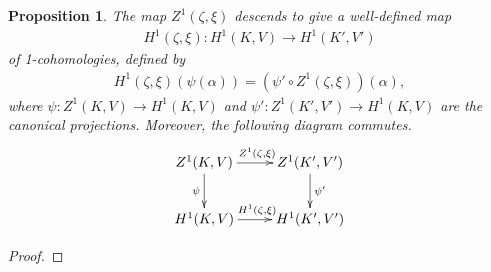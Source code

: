 \documentclass[12pt, a4paper]{amsart}
\newtheorem{prop}{Proposition}
\begin{document}
\begin{prop}
	The map $Z^1(\zeta, \xi)$ descends to give a well-defined map
	\begin{eqnarray*}
		H^1(\zeta, \xi):H^1(K, V) \rightarrow H^1(K', V')
	\end{eqnarray*}
	of 1-cohomologies, defined by
	\begin{eqnarray*}
		H^1(\zeta, \xi)\left(\psi(\alpha)\right) = \left(\psi' \circ Z^1(\zeta, \xi)\right)(\alpha),
	\end{eqnarray*}
	where $\psi:Z^1(K, V)\rightarrow H^1(K, V)$ and $\psi':Z^1(K', V')\rightarrow H^1(K, V)$ are the canonical projections. Moreover, the following diagram commutes.
	\begin{eqnarray*}
	\xymatrix{
	Z^1(K, V) \ar[d]_{\psi} \ar[r]^{Z^1(\zeta, \xi)} & Z^1(K', V') \ar[d]^{\psi'} \\
	H^1(K, V)               \ar[r]^{H^1(\zeta, \xi)} & H^1(K', V') \\
	}
	\end{eqnarray*}
\end{prop}
\begin{proof}
\end{proof}
\end{document}
